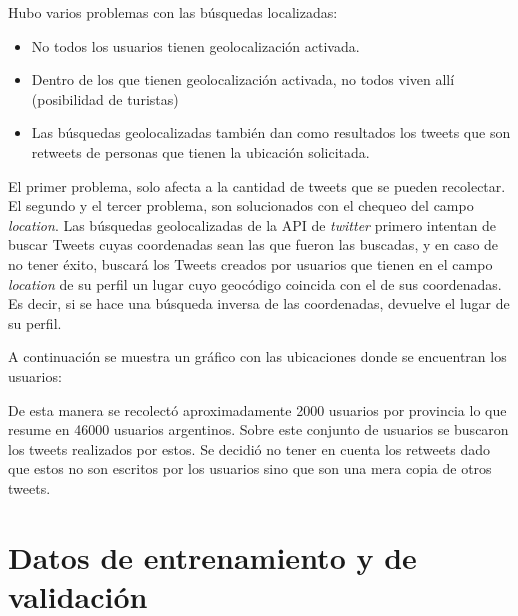 Hubo varios problemas con las búsquedas localizadas:
\begin{itemize}
    \item No todos los usuarios tienen geolocalización activada.
    \item Dentro de los que tienen geolocalización activada, no todos viven allí (posibilidad de turistas)
    \item Las búsquedas geolocalizadas también dan como resultados los tweets que son retweets de personas que tienen la ubicación solicitada.
\end{itemize}
El primer problema, solo afecta a la cantidad de tweets que se pueden recolectar.
El segundo y el tercer problema, son solucionados con el chequeo del campo \textit{location}.
Las búsquedas geolocalizadas de la API de \textit{twitter} primero intentan de buscar Tweets cuyas coordenadas sean las que fueron las buscadas, y en caso de no tener éxito, buscará los Tweets creados por usuarios que tienen en el campo \textit{location} de su perfil un lugar cuyo geocódigo coincida con el de sus coordenadas. Es decir, si se hace una búsqueda inversa de las coordenadas, devuelve el lugar de su perfil.  

A continuación se muestra un gráfico con las ubicaciones donde se encuentran los usuarios:



De esta manera se recolectó aproximadamente 2000 usuarios por provincia lo que resume en 46000 usuarios argentinos. Sobre este conjunto de usuarios se buscaron los tweets realizados por estos. Se decidió no tener en cuenta los retweets dado que estos no son escritos por los usuarios sino que son una mera copia de otros tweets. %

\section{Datos de entrenamiento y de validación}

